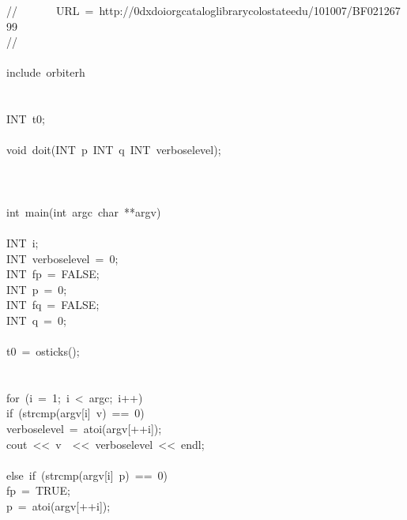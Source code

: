 \begin{tabbing}
//\ \ \ \ \ \ \ URL\ =\ http://0dxdoiorgcataloglibrarycolostateedu/101007/BF02126799\\[0pt]
//\\[0pt]
\\[0pt]
include\ orbiterh\\[0pt]
\\[0pt]
\\[0pt]
INT\ t0;\\[0pt]
\\[0pt]
void\ doit(INT\ p\ INT\ q\ INT\ verboselevel);\\[0pt]
\\[0pt]
\\[0pt]
\\[0pt]
int\ main(int\ argc\ char\ **argv)\\[0pt]
\\[0pt]
\>INT\ i;\\[0pt]
\>INT\ verboselevel\ =\ 0;\\[0pt]
\>INT\ fp\ =\ FALSE;\\[0pt]
\>INT\ p\ =\ 0;\\[0pt]
\>INT\ fq\ =\ FALSE;\\[0pt]
\>INT\ q\ =\ 0;\\[0pt]
\\[0pt]
\>t0\ =\ osticks();\\[0pt]
\\[0pt]
\>\\[0pt]
\>for\ (i\ =\ 1;\ i\ <\ argc;\ i++)\ \\[0pt]
\>\>if\ (strcmp(argv[i]\ v)\ ==\ 0)\ \\[0pt]
\>\>\>verboselevel\ =\ atoi(argv[++i]);\\[0pt]
\>\>\>cout\ <<\ v\ \ <<\ verboselevel\ <<\ endl;\\[0pt]
\>\>\>\\[0pt]
\>\>else\ if\ (strcmp(argv[i]\ p)\ ==\ 0)\ \\[0pt]
\>\>\>fp\ =\ TRUE;\\[0pt]
\>\>\>p\ =\ atoi(argv[++i]);\\[0pt]

\end{tabbing}
